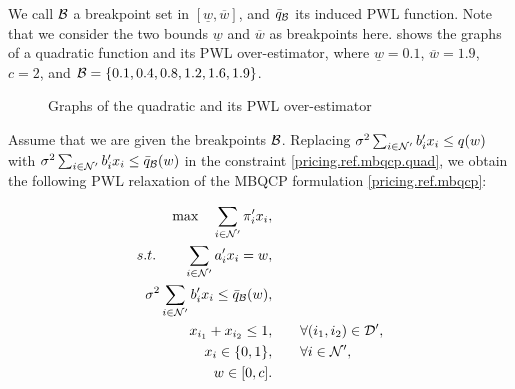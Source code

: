 We call \(\mathcal B\) a breakpoint set in \([\underline{w},\overline{w}]\), and \(\bar{q}_{\mathcal B}\) its  induced PWL function. Note that we consider the two bounds  \(\underline{w}\) and \(\overline{w}\) as breakpoints here.  shows the graphs of a quadratic function and its PWL over-estimator, where $\underline{w}=0.1$, $\overline{w}=1.9$, $c=2$, and $\mathcal B = \{0.1, 0.4,0.8,1.2,1.6, 1.9\}$.

\begin{figure}
    \centering
{}
    \caption{Graphs of the quadratic and its PWL over-estimator}
    \label{fig:func}
\end{figure}

Assume that we are given the breakpoints $\mathcal B$. Replacing $  \sigma^2\sum_{i \in \mathcal N'} b'_i x_i \le q(w)$ with  $  \sigma^2\sum_{i \in \mathcal N'} b'_i x_i \le \bar{q}_\mathcal B(w)$ in the constraint \eqref{pricing.ref.mbqcp.quad}, we obtain the following PWL relaxation of the MBQCP formulation \eqref{pricing.ref.mbqcp}:

\begin{subequations}
\label{pricing.rel.mbqcp}
\begin{align}
  	 \max \quad \sum_{i\in \mathcal N'} \pi'_i x_i, \qquad& \\
    s.t. \qquad  \sum_{i \in \mathcal N'} a'_i x_i = w, \qquad & \label{pricing.rel.mbqcp.eq} \\
    \sigma^2\sum_{i \in \mathcal N'} b'_i x_i  \le  \bar{q}_{\mathcal B}(w),\qquad& \label{pricing.rel.mbqcp.quad}\\
    x_{i_1} + x_{i_2} \le 1, \qquad & \forall (i_1, i_2) \in \mathcal D', \\
    x_i \in \{0,1\},\qquad & \forall  i  \in \mathcal N', \\
    w \in [0,c].\qquad &
\end{align}
\end{subequations}



